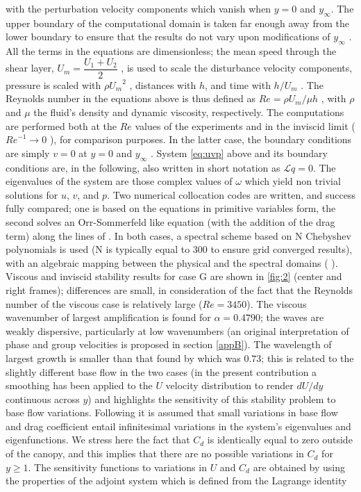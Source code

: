 with the perturbation velocity components which vanish when $y=0$ and $y_{\infty}$. The upper boundary
of the computational domain is taken far enough away from the lower boundary to ensure that the
results do not vary upon modifications of $y_{\infty}$ . All the terms in the equations are dimensionless; the
mean speed through the shear layer, $U_m = \dfrac{U_1 +U_2}{2}$ , is used to scale the disturbance velocity components, pressure is scaled with
$\rho {U_m}^2$ , distances with $h$, and time with $h/U_m$ . The Reynolds number
in the equations above is thus defined as $Re = \rho U_m/ \mu h$ , with $\rho$ and $\mu$ the fluid’s density and dynamic
viscosity, respectively. The computations are performed both at the $Re$ values of the experiments
and in the inviscid limit (${Re}^{-1}  \rightarrow 0$ ), for comparison purposes. In the latter case, the boundary
conditions are simply $v = 0$ at $y = 0$ and $y_{\infty}$ .
System \ref{eq:uvp} above and its boundary conditions are, in the following, also written in short
notation as $\mathscr{L} q = 0$. The eigenvalues of the system are those complex values of $\omega$ which yield
non trivial solutions for $u$, $v$, and $p$. Two numerical collocation codes are written, and success fully compared; one is based on the equations in primitive variables form, the second solves an
Orr-Sommerfeld like equation (with the addition of the drag term) along the lines of \citet{singh2016linear}.
In both cases, a spectral scheme based on N Chebyshev polynomials is used (N is typically equal
to 300 to ensure grid converged results), with an algebraic mapping between the physical and the
spectral domains (\citet{hussaini1987spectral} ).
Viscous and inviscid stability results for case G are shown in \ref{fig:2} (center and right frames);
differences are small, in consideration of the fact that the Reynolds number of the viscous case
is relatively large ($Re = 3450$). The viscous wavenumber of largest amplification is found for
$\alpha = 0.4790$; the waves are weakly dispersive, particularly at low wavenumbers (an original interpretation of phase and group velocities is proposed in section \ref{appB}). The wavelength of largest
growth is smaller than that found by \citet{zampogna2016instability} which was $0.73$; this is related to the slightly
different base flow in the two cases (in the present contribution a smoothing has been applied to the
$U$ velocity distribution to render $dU/dy$ continuous across $y$) and highlights the sensitivity of this
stability problem to base flow variations.
Following \citet{bottaro2003effect} it is assumed that small variations in base flow and drag coefficient
entail infinitesimal variations in the system’s eigenvalues and eigenfunctions. We stress here the fact
that $C_d$ is identically equal to zero outside of the canopy, and this implies that there are no possible
variations in $C_d$ for $y \geq 1$. The sensitivity functions to variations in $U$ and $C_d$ are obtained by using
the properties of the adjoint system which is defined from the Lagrange identity

